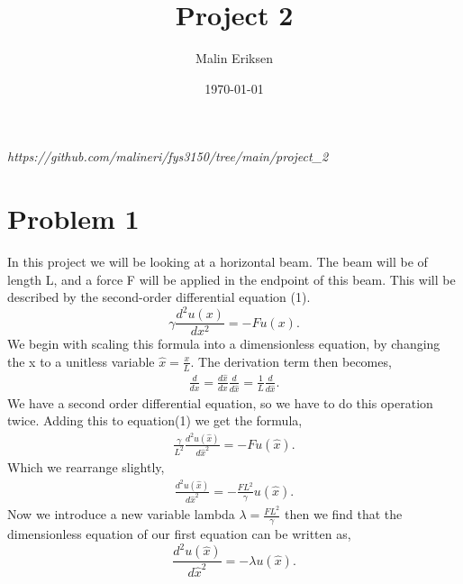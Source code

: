 \documentclass[english,notitlepage]{revtex4-1}  %
\begin{document}
\title{Project 2}      %
\author{Malin Eriksen}          %
\date{\today}                             %
\noaffiliation                            %


\maketitle 
    
\textit{https://github.com/malineri/fys3150/tree/main/project\_2}
    
\section*{Problem 1}
In this project we will be looking at a horizontal beam. The beam will be of length L, and a force F will be applied in the endpoint of this beam. This will be described by the second-order differential equation (1).
\begin{equation}\label{eq:newton}
    \gamma \frac{d^2 u(x)}{dx^2} = -F u(x).
\end{equation}
We begin with scaling this formula into a dimensionless equation, by changing the x to a unitless variable $\hat{x} = \frac{x}{L}$. The derivation term then becomes, 
\begin{align*}
\frac{d}{dx} = \frac{d\hat{x}}{dx} \frac{d}{d\hat{x}} = \frac{1}{L} \frac{d}{d \hat{x}}.
\end{align*}
We have a second order differential equation, so we have to do this operation twice. 
Adding this to equation(1) we get the formula,
\begin{align*}
 \frac{\gamma}{L^2} \frac{d^2 u(\hat{x})}{d\hat{x}^2} = -F u(\hat{x}).
\end{align*}
Which we rearrange slightly, 
\begin{align*}
\frac{d^2 u(\hat{x})}{d\hat{x}^2} = - \frac{F L^2}{\gamma} u(\hat{x}).
\end{align*}
Now we introduce a new variable lambda $\lambda = \frac{F L^2}{\gamma}$ then we find that the dimensionless equation of our first equation can be written as, 
\begin{equation}\label{eq:newton}
    \frac{d^2 u(\hat{x})}{d\hat{x}^2} = - \lambda u(\hat{x}).
\end{equation} 
\newpage{}
\end{document}
